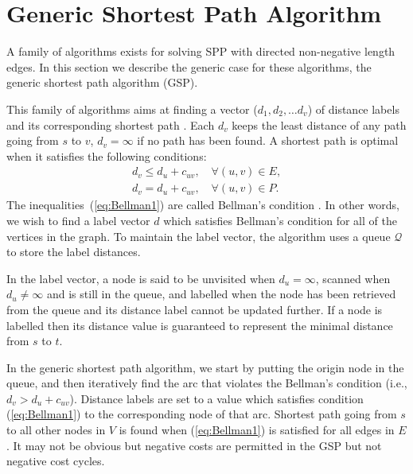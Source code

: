 \begin{comment}
Through out the report,
run-time analysis (big O and other notations) is used to demonstrate the estimation of algorithm running time regarding their input size. 
\todo[inline]{How do I nicely say `let the reader refer to other resources?'
or do I describe what big O notation is?}
\end{comment}

\section{Generic Shortest Path Algorithm}
A family of algorithms exists for solving SPP with directed non-negative length edges.
In this section we describe the generic case for these
algorithms, the generic shortest path algorithm (GSP).

This family of algorithms aims at finding a 
vector ($d_1, d_2,\dots d_v$) of distance labels and its corresponding shortest path \citep{Klunder}.
Each $d_v$ keeps the least distance of any path going from $s$ to $v$, $d_v = \infty$ if no path has been found.
A shortest path is optimal when it satisfies the following conditions:
\begin{align}
    d_v \leq d_u + c_{uv}, \quad \forall(u,v) \in E, \label{eq:Bellman1}\\
    d_v  =   d_u + c_{uv}, \quad \forall(u,v) \in P.
\end{align}
The inequalities~(\ref{eq:Bellman1}) are called Bellman's condition \citep{Bellman}.
In other words,
we wish to find a label vector $d$ which satisfies Bellman's condition for all of the vertices in the graph.
To maintain the label vector, the algorithm uses a queue $\mathcal{Q}$ to store the label distances.

In the label vector,
a node is said to be unvisited when $d_u = \infty$,
scanned when $d_u \neq \infty$ and is still in the queue,
and labelled when the node has been retrieved from the queue and its distance label cannot be updated further.
If a node is labelled then its distance value is guaranteed to represent the minimal distance from $s$ to $t$.

In the generic shortest path algorithm,
we start by putting the origin node in the queue,
and then iteratively find the arc that violates the Bellman's condition (i.e., $d_v > d_u + c_{uv}$).
Distance labels are set to a value which satisfies condition (\ref{eq:Bellman1}) to the corresponding node of that arc.
Shortest path going from $s$ to all other nodes in $V$ is found when (\ref{eq:Bellman1}) is satisfied for all edges in $E$.
It may not be obvious but negative costs are permitted in the GSP but not negative cost cycles.

